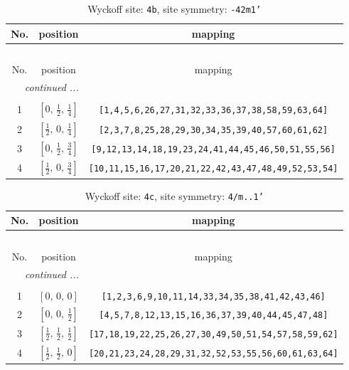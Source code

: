 \documentclass[fleqn,8pt]{jsarticle}
\begin{document}
\begin{longtable}{ccc}
\caption{Wyckoff site: {\tt 4b}, site symmetry: {\tt -42m1'}}
 \\
 \hline \hline
No. & position & mapping \\ \hline \endfirsthead

\multicolumn{2}{l}{\tablename\ \thetable{}} \\
 \hline \hline
No. & position & mapping \\ \hline \endhead

 \hline \hline
\multicolumn{2}{r}{\footnotesize\it continued ...} \\ \endfoot

 \hline \hline
\multicolumn{2}{r}{} \\ \endlastfoot

1 & $\left[ 0,\, \frac{1}{2},\, \frac{1}{4} \right]$ & {\tt [1,4,5,6,26,27,31,32,33,36,37,38,58,59,63,64]} \\ \hline
2 & $\left[ \frac{1}{2},\, 0,\, \frac{1}{4} \right]$ & {\tt [2,3,7,8,25,28,29,30,34,35,39,40,57,60,61,62]} \\ \hline
3 & $\left[ 0,\, \frac{1}{2},\, \frac{3}{4} \right]$ & {\tt [9,12,13,14,18,19,23,24,41,44,45,46,50,51,55,56]} \\ \hline
4 & $\left[ \frac{1}{2},\, 0,\, \frac{3}{4} \right]$ & {\tt [10,11,15,16,17,20,21,22,42,43,47,48,49,52,53,54]} \\
\end{longtable}
\renewcommand{\arraystretch}{1.2}
\begin{longtable}{ccc}
\caption{Wyckoff site: {\tt 4c}, site symmetry: {\tt 4/m..1'}}
 \\
 \hline \hline
No. & position & mapping \\ \hline \endfirsthead

\multicolumn{2}{l}{\tablename\ \thetable{}} \\
 \hline \hline
No. & position & mapping \\ \hline \endhead

 \hline \hline
\multicolumn{2}{r}{\footnotesize\it continued ...} \\ \endfoot

 \hline \hline
\multicolumn{2}{r}{} \\ \endlastfoot

1 & $\left[ 0,\, 0,\, 0 \right]$ & {\tt [1,2,3,6,9,10,11,14,33,34,35,38,41,42,43,46]} \\ \hline
2 & $\left[ 0,\, 0,\, \frac{1}{2} \right]$ & {\tt [4,5,7,8,12,13,15,16,36,37,39,40,44,45,47,48]} \\ \hline
3 & $\left[ \frac{1}{2},\, \frac{1}{2},\, \frac{1}{2} \right]$ & {\tt [17,18,19,22,25,26,27,30,49,50,51,54,57,58,59,62]} \\ \hline
4 & $\left[ \frac{1}{2},\, \frac{1}{2},\, 0 \right]$ & {\tt [20,21,23,24,28,29,31,32,52,53,55,56,60,61,63,64]} \\
\end{longtable}
\end{document}
